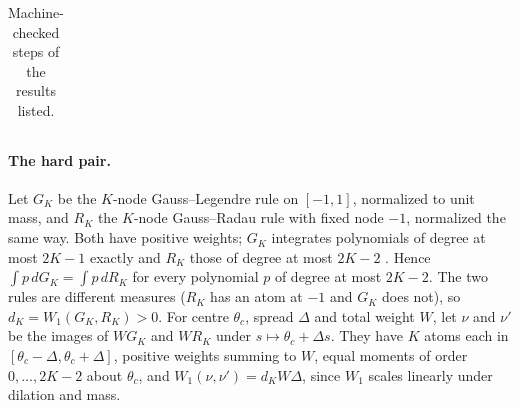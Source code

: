 \documentclass[12pt]{article}
\theoremstyle{definition}
\theoremstyle{remark}
\begin{document}
\begin{table}[ht]
\begin{tabular}{>{\raggedright\arraybackslash}p{}>{\raggedright\arraybackslash}p{}>{\raggedright\arraybackslash}p{}}
\bottomrule
\end{tabular}
\caption{Machine-checked steps of the results listed.}\label{tab:newlean}
\end{table}

\paragraph{The hard pair.} Let $G_K$ be the $K$-node Gauss--Legendre rule on $[-1,1]$, normalized to unit mass, and $R_K$ the $K$-node Gauss--Radau rule with fixed node $-1$, normalized the same way. Both have positive weights; $G_K$ integrates polynomials of degree at most $2K-1$ exactly and $R_K$ those of degree at most $2K-2$ \citep[Section~3.4]{szego1975}. Hence $\int p\,dG_K=\int p\,dR_K$ for every polynomial $p$ of degree at most $2K-2$. The two rules are different measures ($R_K$ has an atom at $-1$ and $G_K$ does not), so $d_K=W_1(G_K,R_K)>0$. For centre $\theta_c$, spread $\Delta$ and total weight $W$, let $\nu$ and $\nu'$ be the images of $WG_K$ and $WR_K$ under $s\mapsto\theta_c+\Delta s$. They have $K$ atoms each in $[\theta_c-\Delta,\theta_c+\Delta]$, positive weights summing to $W$, equal moments of order $0,\ldots,2K-2$ about $\theta_c$, and $W_1(\nu,\nu')=d_KW\Delta$, since $W_1$ scales linearly under dilation and mass.
\end{document}
